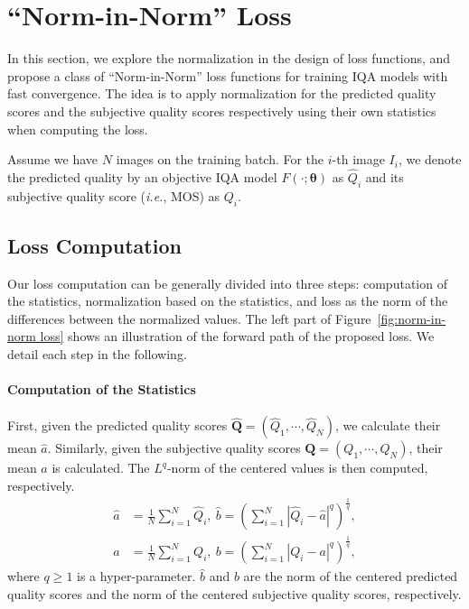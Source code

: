 \documentclass[sigconf]{acmart}
\begin{document}
\section{``Norm-in-Norm'' Loss}
\label{sec:loss}

In this section, we explore the normalization in the design of loss functions, and propose a class of ``Norm-in-Norm'' loss functions for training IQA models with fast convergence.
The idea is to apply normalization for the predicted quality scores and the subjective quality scores respectively using their own statistics when computing the loss. 

Assume we have $N$ images on the training batch. 
For the $i$-th image $I_i$, we denote the predicted quality by an objective IQA model $F(\cdot; \bm{\theta})$ as $\hat{Q}_{i}$ and its subjective quality score (\textit{i.e.}, MOS) as $Q_{i}$.

\subsection{Loss Computation}
\label{sec:loss computation}
Our loss computation can be generally divided into three steps: computation of the statistics, normalization based on the statistics, and loss as the norm of the differences between the normalized values.
The left part of Figure~\ref{fig:norm-in-norm loss} shows an illustration of the forward path of the proposed loss. 
We detail each step in the following.

\paragraph{Computation of the Statistics} 
First, given the predicted quality scores $\hat{\mathbf{Q}}=(\hat{Q}_{1}, \cdots, \hat{Q}_{N})$, we calculate their mean $\hat{a}$. 
Similarly, given the subjective quality scores ${\mathbf{Q}}=({Q}_{1}, \cdots, {Q}_{N})$, their mean $a$ is calculated. 
The $L^q$-norm of the centered values is then computed, respectively.
\begin{align}
\hat{a} &= \frac{1}{N}\sum_{i=1}^{N} \hat{Q}_{i},\ 
\hat{b} = {\left(\sum_{i=1}^{N} {|\hat{Q}_{i}-\hat{a}|}^{q}\right)}^{\frac{1}{q}}, \\
a &= \frac{1}{N}\sum_{i=1}^{N} {Q}_{i},\ 
b = {\left(\sum_{i=1}^{N} {|{Q}_{i}-{a}|}^{q}\right)}^{\frac{1}{q}}\label{eq:stats2},
\end{align}
where $q\ge 1$ is a hyper-parameter. $\hat{b}$ and $b$ are the norm of the centered predicted quality scores and the norm of the centered subjective quality scores, respectively.
\end{document}
